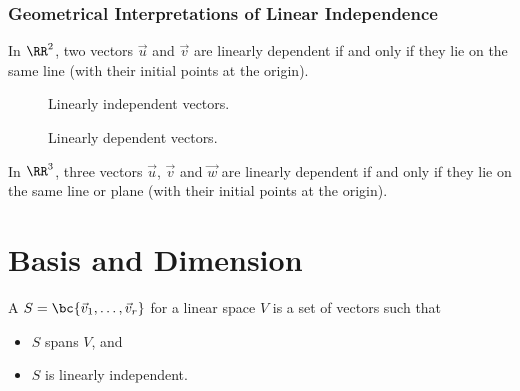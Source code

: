 \subsubsection{Geometrical Interpretations of Linear Independence}

In $\RR^2$, two vectors $\vec u$ and $\vec v$ are linearly dependent if and only if they lie on the same line (with their initial points at the origin).

\noindent\begin{minipage}{0.5\textwidth}
    \begin{figure}[H]
    \centering
    \caption{Linearly independent vectors.}
    \end{figure}
\end{minipage}
\begin{minipage}{0.5\textwidth}
    \begin{figure}[H]
    \centering
    \caption{Linearly dependent vectors.}
    \end{figure}
\end{minipage}

\medskip

In $\RR^3$, three vectors $\vec u$, $\vec v$ and $\vec w$ are linearly dependent if and only if they lie on the same line or plane (with their initial points at the origin).

\section{Basis and Dimension}

\begin{definition}
    A  $S = \bc{\vec v_1, \dots, \vec v_r}$ for a linear space $V$ is a set of vectors such that
    \begin{itemize}
        \item $S$ spans $V$, and
        \item $S$ is linearly independent.
    \end{itemize}
\end{definition}

